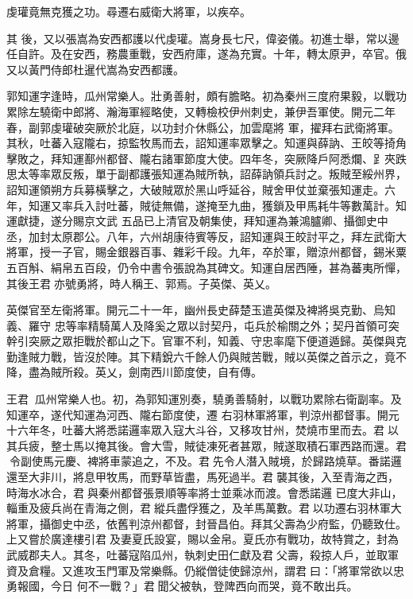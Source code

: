 \begin{pinyinscope}
 虔瓘竟無克獲之功。尋遷右威衛大將軍，以疾卒。



 其
 後，又以張嵩為安西都護以代虔瓘。嵩身長七尺，偉姿儀。初進士舉，常以邊任自許。及在安西，務農重戰，安西府庫，遂為充實。十年，轉太原尹，卒官。俄又以黃門侍郎杜暹代嵩為安西都護。



 郭知運字逢時，瓜州常樂人。壯勇善射，頗有膽略。初為秦州三度府果毅，以戰功累除左驍衛中郎將、瀚海軍經略使，又轉檢校伊州刺史，兼伊吾軍使。開元二年春，副郭虔瓘破突厥於北庭，以功封介休縣公，加雲麾將
 軍，擢拜右武衛將軍。其秋，吐蕃入寇隴右，掠監牧馬而去，詔知運率眾擊之。知運與薛訥、王皎等掎角擊敗之，拜知運鄯州都督、隴右諸軍節度大使。四年冬，突厥降戶阿悉爛、𧾷夾跌思太等率眾反叛，單于副都護張知運為賊所執，詔薛訥領兵討之。叛賊至綏州界，詔知運領朔方兵募橫擊之，大破賊眾於黑山呼延谷，賊舍甲仗並棄張知運走。六年，知運又率兵入討吐蕃，賊徒無備，遂掩至九曲，獲鎖及甲馬耗牛等數萬計。知運獻捷，遂分賜京文武
 五品已上清官及朝集使，拜知運為兼鴻臚卿、攝御史中丞，加封太原郡公。八年，六州胡康待賓等反，詔知運與王皎討平之，拜左武衛大將軍，授一子官，賜金銀器百事、雜彩千段。九年，卒於軍，贈涼州都督，錫米粟五百斛、絹帛五百段，仍令中書令張說為其碑文。知運自居西陲，甚為蕃夷所憚，其後王君亦號勇將，時人稱王、郭焉。子英傑、英乂。



 英傑官至左衛將軍。開元二十一年，幽州長史薛楚玉遣英傑及裨將吳克勤、烏知義、羅守
 忠等率精騎萬人及降奚之眾以討契丹，屯兵於榆關之外；契丹首領可突幹引突厥之眾拒戰於都山之下。官軍不利，知義、守忠率麾下便道遁歸。英傑與克勤逢賊力戰，皆沒於陣。其下精銳六千餘人仍與賊苦戰，賊以英傑之首示之，竟不降，盡為賊所殺。英乂，劍南西川節度使，自有傳。



 王君，瓜州常樂人也。初，為郭知運別奏，驍勇善騎射，以戰功累除右衛副率。及知運卒，遂代知運為河西、隴右節度使，遷
 右羽林軍將軍，判涼州都督事。開元十六年冬，吐蕃大將悉諾邏率眾入寇大斗谷，又移攻甘州，焚燒市里而去。君以其兵疲，整士馬以掩其後。會大雪，賊徒凍死者甚眾，賊遂取積石軍西路而還。君令副使馬元慶、裨將車蒙追之，不及。君先令人潛入賊境，於歸路燒草。番諾邏還至大非川，將息甲牧馬，而野草皆盡，馬死過半。君襲其後，入至青海之西，時海水冰合，君與秦州都督張景順等率將士並乘冰而渡。會悉諾邏
 已度大非山，輜重及疲兵尚在青海之側，君縱兵盡俘獲之，及羊馬萬數。君以功遷右羽林軍大將軍，攝御史中丞，依舊判涼州都督，封晉昌伯。拜其父壽為少府監，仍聽致仕。上又嘗於廣達樓引君及妻夏氏設宴，賜以金帛。夏氏亦有戰功，故特賞之，封為武威郡夫人。其冬，吐蕃寇陷瓜州，執刺史田仁獻及君父壽，殺掠人戶，並取軍資及倉糧。又進攻玉門軍及常樂縣。仍縱僧徒使歸涼州，謂君曰：「將軍常欲以忠勇報國，今日
 何不一戰？」君聞父被執，登陴西向而哭，竟不敢出兵。




\end{pinyinscope}
